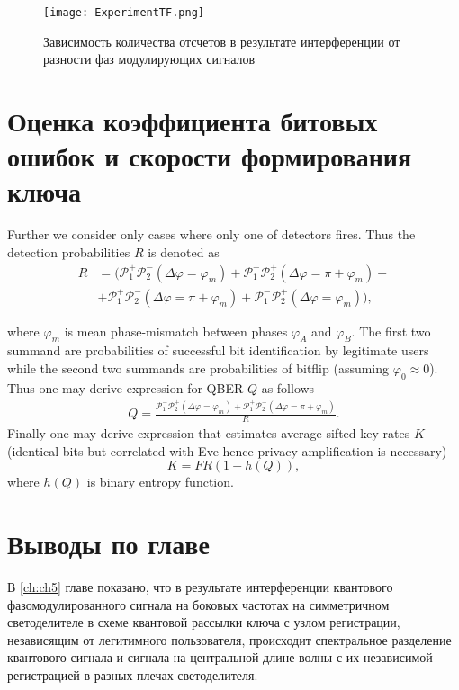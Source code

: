  \begin{figure}[ht]
  \centering
  \texttt{[image: ExperimentTF.png]}
  \caption{Зависимость количества отсчетов в результате интерференции от разности фаз модулирующих сигналов}
  \label{fig:Experimental_TF}
\end{figure}


\pagebreak

\section{Оценка коэффициента битовых ошибок и скорости формирования ключа} \label{ch:ch5/sect7}

Further we consider only cases where only one of detectors fires. Thus the detection probabilities $R$ is denoted as
\begin{align}
    R&=\Big(\mathcal{P}_{1}^{+}\mathcal{P}_{2}^{-}(\Delta\varphi=\varphi_m)+\mathcal{P}_{1}^{-}\mathcal{P}_{2}^{+}(\Delta\varphi=\pi+\varphi_m)+ \nonumber \\
    &+\mathcal{P}_{1}^{+}\mathcal{P}_{2}^{-}(\Delta\varphi=\pi+\varphi_m)+\mathcal{P}_{1}^{-}\mathcal{P}_{2}^{+}(\Delta\varphi=\varphi_m)\Big),
\end{align}



where $\varphi_m$ is mean phase-mismatch between phases $\varphi_A$ and $\varphi_B$. The first two summand are probabilities of successful bit identification by legitimate users while the second two summands are probabilities of bitflip (assuming $\varphi_0 \approx 0$). Thus one may derive expression for QBER $Q$ as follows
\begin{align}
    Q=\frac{\mathcal{P}_{1}^{-}\mathcal{P}_{2}^{+}(\Delta\varphi=\varphi_m)+\mathcal{P}_{1}^{+}\mathcal{P}_{2}^{-}(\Delta\varphi=\pi+\varphi_m)}{R}.
\end{align}
Finally one may derive expression that estimates average sifted key rates $K$ (identical bits but correlated with Eve hence privacy amplification is necessary)
\begin{equation}
    K=FR(1-h(Q)),
\end{equation}
where $h(Q)$ is binary entropy function.
\pagebreak

\section{Выводы по главе} \label{ch:ch5/sect5}


В \ref{ch:ch5} главе показано, что в результате интерференции квантового фазомодулированного сигнала на боковых частотах на симметричном светоделителе в схеме квантовой рассылки ключа с узлом регистрации, независящим от легитимного пользователя, происходит спектральное разделение квантового сигнала и сигнала на центральной длине волны с их независимой регистрацией в разных плечах светоделителя. 

\pagebreak
